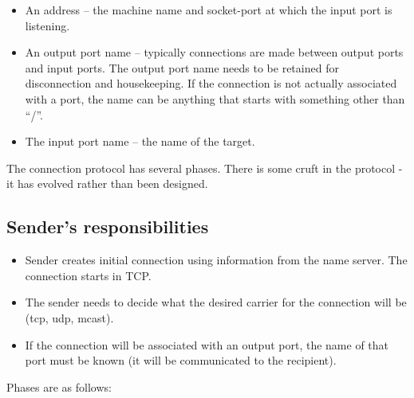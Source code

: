 \documentclass[a4]{article}
\begin{document}
\begin{itemize}

\item An address -- the machine name and socket-port at which
the input port is listening.

\item An output port name -- typically connections are made
between output ports and input ports.  The output port name
needs to be retained for disconnection and housekeeping.
If the connection is not actually associated with a port,
the name can be anything that starts with something
other than ``/''.

\item The input port name -- the name of the target.

\end{itemize}


The connection protocol has several phases.
There is some cruft in the protocol - it has evolved rather than
been designed.



\subsection{Sender's responsibilities}

\begin{itemize}

\item Sender creates initial connection using information 
from the name server.  The connection starts in TCP.

\item The sender needs to decide what the desired carrier
for the connection will be (tcp, udp, mcast).

\item If the connection will be associated with an output port, the
name of that port must be known (it will be communicated to the
recipient).

\end{itemize}

Phases are as follows:
\end{document}
